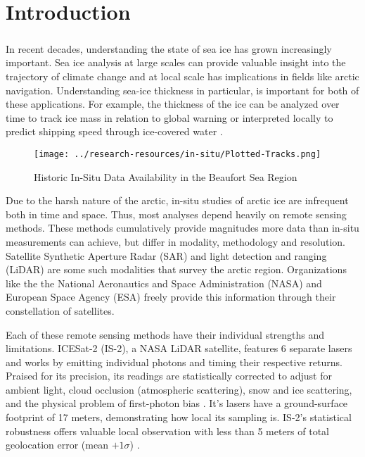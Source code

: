 \chapter{Introduction}
\label{sec:Introduction}

\paragraph{}

\indent In recent decades, understanding the state of sea ice has grown increasingly important. Sea ice analysis at large scales can provide valuable insight into the trajectory of climate change and at local scale has implications in fields like arctic navigation. Understanding sea-ice thickness in particular, is important for both of these applications.  For example, the thickness of the ice can be analyzed over time to track ice mass in relation to global warning or interpreted locally to predict shipping speed through ice-covered water \cite{sea-ice-properties}.

\begin{wrapfigure}{R}{0.35\textwidth}
	\centering
	\texttt{[image: ../research-resources/in-situ/Plotted-Tracks.png]}
	\caption{Historic In-Situ Data Availability in the Beaufort Sea Region}
	\label{fig:foobar}
\end{wrapfigure}


\indent Due to the harsh nature of the arctic, in-situ studies of arctic ice are infrequent both in time and space. Thus, most analyses depend heavily on remote sensing methods. These methods cumulatively provide magnitudes more data than in-situ measurements can achieve, but differ in modality, methodology and resolution. Satellite Synthetic Aperture Radar (SAR) and light detection and ranging (LiDAR) are some such modalities that survey the arctic region. Organizations like the the National Aeronautics and Space Administration (NASA) and European Space Agency (ESA) freely provide this information through their constellation of satellites.


Each of these remote sensing methods have their individual strengths and limitations. ICESat-2 (IS-2), a NASA LiDAR satellite, features 6 separate lasers and works by emitting individual photons and timing their respective returns.
Praised for its precision, its readings are statistically corrected to adjust for ambient light, cloud occlusion (atmospheric scattering), snow and ice scattering, and the physical problem of first-photon bias \cite{ICESat-2-ATL10-Product}. It's lasers have a ground-surface footprint of 17 meters, demonstrating how local its sampling is. IS-2's statistical robustness offers valuable local observation with less than 5 meters of total geolocation error (mean \(+ 1\sigma\)) \cite{ICESat-2-Horizontal-Accuracy}.

